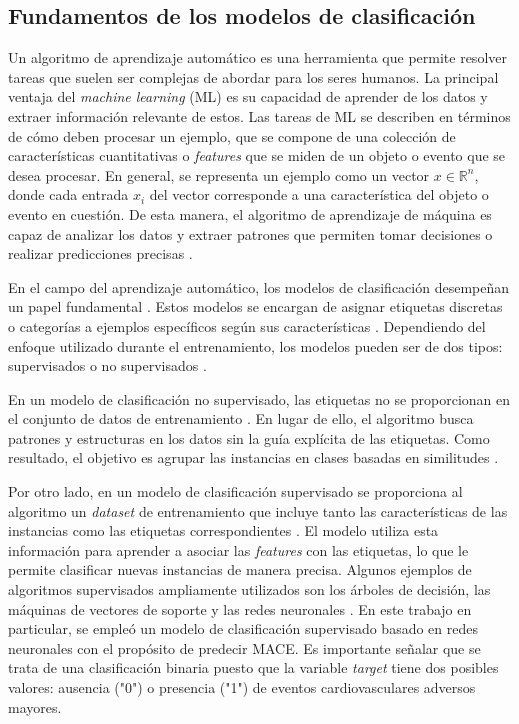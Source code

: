\subsection{Fundamentos de los modelos de clasificación}
Un algoritmo de aprendizaje automático es una herramienta que permite resolver tareas  
que suelen ser complejas de abordar para los seres humanos. La principal ventaja del \emph{machine 
learning} (ML) es su capacidad de aprender de los datos y extraer información relevante de 
estos. Las tareas de ML se describen en términos de cómo deben procesar un ejemplo, que se 
compone de una colección de características cuantitativas o \emph{features} que se miden de un objeto 
o evento que se desea procesar. En general, se representa un ejemplo como un vector $ x\in\mathbb{R}^n $,
donde cada entrada $x_{i}$ del vector corresponde a una característica del objeto 
o evento en cuestión. De esta manera, el algoritmo de aprendizaje de máquina es capaz de 
analizar los datos y extraer patrones que permiten tomar decisiones o realizar predicciones 
precisas \citep{CITE:35}.

En el campo del aprendizaje automático, los modelos de clasificación desempeñan un papel fundamental 
\citep{CITE:32}. Estos modelos se encargan de asignar etiquetas discretas o categorías a ejemplos 
específicos según sus características \citep{CITE:33}. Dependiendo del enfoque utilizado durante el 
entrenamiento, los modelos pueden ser de dos tipos: supervisados o no supervisados \citep{CITE:35}.

En un modelo de clasificación no supervisado, las etiquetas no se proporcionan en el conjunto de 
datos de entrenamiento \citep{CITE:34}. En lugar de ello, el algoritmo busca patrones y estructuras 
en los datos sin la guía explícita de las etiquetas. Como resultado, el objetivo es agrupar las instancias en 
clases basadas en similitudes \citep{CITE:33}.

Por otro lado, en un modelo de clasificación supervisado se proporciona al algoritmo un \emph{dataset} de 
entrenamiento que incluye tanto las características de las instancias como las etiquetas correspondientes 
\citep{CITE:33}. El modelo utiliza esta información para aprender a asociar las \emph{features} con las 
etiquetas, lo que le permite clasificar nuevas instancias de manera precisa. Algunos ejemplos de algoritmos 
supervisados ampliamente utilizados son los árboles de decisión, las máquinas de vectores de soporte y 
las redes neuronales \citep{CITE:34}. En este trabajo en particular, se empleó un modelo de clasificación 
supervisado basado en redes neuronales con el propósito de predecir MACE. Es importante señalar que se trata
de una clasificación binaria puesto que la variable \emph{target} tiene dos posibles valores: ausencia ("0") o 
presencia ("1") de eventos cardiovasculares adversos mayores.

